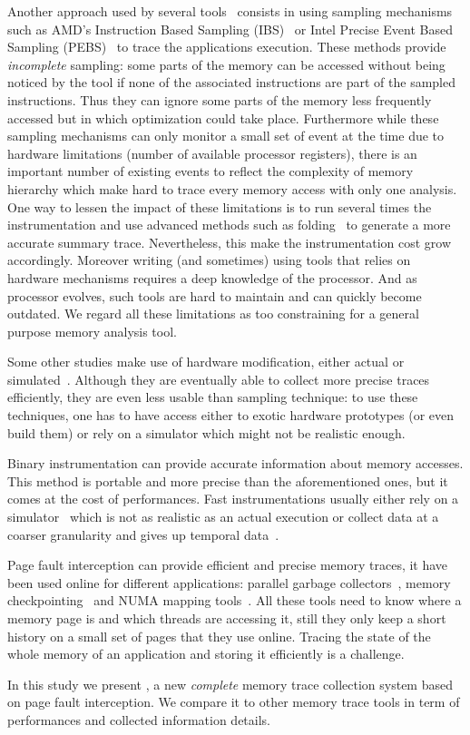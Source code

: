 Another approach used by several
tools~\cite{Lachaize12MemProf,McCurdy10Memphis,Liu14Tool,Gimenez14Dissecting}
consists in using sampling mechanisms such as AMD's Instruction Based Sampling
(IBS)~\cite{Drongowski07Instructionbased} or Intel Precise Event Based
Sampling (PEBS)~\cite{Levinthal2009} to trace the applications execution. These methods
provide \emph{incomplete} sampling: some parts of the memory can be accessed without
being noticed by the tool if none of the associated instructions are part of the sampled
instructions.
Thus they can ignore some parts of the memory less frequently accessed but in which
optimization could take place.
Furthermore while these sampling mechanisms can only monitor a small set of event
at the time due to hardware limitations (number of available processor
registers), there is an important number of existing events to reflect the
complexity of memory hierarchy which make hard to trace every memory
access with only one analysis.
One way to lessen the impact of these limitations is to run several times the
instrumentation and use advanced methods such as
folding~\cite{Servat15Towards} to generate a more accurate summary trace.
Nevertheless, this make the instrumentation cost grow accordingly.
Moreover writing (and sometimes) using tools that relies on hardware mechanisms
requires a deep knowledge of the processor. And as processor evolves,
such tools are hard to maintain and can quickly become outdated.
We regard all these limitations as too constraining for a general purpose
memory analysis tool.

Some other studies make use of hardware modification, either actual or
simulated~\cite{Bao08HMTT,Martonosi92MemSpy}.  Although they are eventually able to collect
more precise traces efficiently, they are even less usable than sampling technique: to use
these techniques, one has to have access either to exotic hardware prototypes
(or even build them) or rely on a simulator which might not be realistic
enough.

Binary instrumentation can provide accurate information about memory accesses.
This method is portable and  more precise than the aforementioned ones,
but it comes at the cost of performances. Fast
instrumentations usually either rely on a simulator~\cite{DeRose02SIGMA} which is not as realistic as an actual execution
or collect data at a coarser granularity and gives up temporal
data~\cite{Beniamine15TABARNAC}.


Page fault interception can provide efficient and precise memory traces, it
have been used online for different applications: parallel garbage
collectors~\cite{Boehm91Mostly}, memory
checkpointing~\cite{Heo05Spaceefficient} and NUMA mapping
tools~\cite{Diener13CommunicationBased}. All these tools need to know where a
memory page is and which threads are accessing it, still they only keep a
short history on a small set of pages that they use online. Tracing the state
of the whole memory of an application and storing it efficiently is a
challenge.

In this study we present \Moca, a new \emph{complete} memory trace collection system based on page
fault interception. We compare it to other memory trace tools in term of
performances and collected information details.
